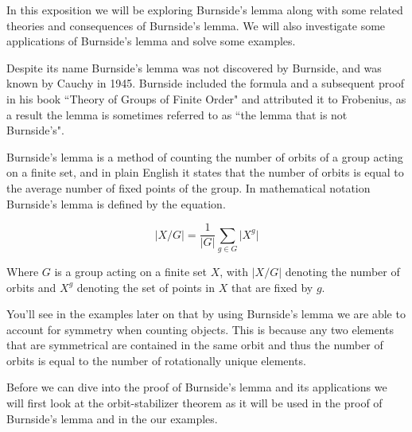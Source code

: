 \documentclass[../main.tex]{subfiles}
\begin{document}
    In this exposition we will be exploring Burnside's lemma along with some related theories and consequences of Burnside's lemma. We will also investigate some applications of Burnside's lemma and solve some examples.
    
    Despite its name Burnside's lemma was not discovered by Burnside, and was known by Cauchy in 1945. Burnside included the formula and a subsequent proof in his book ``Theory of Groups of Finite Order" and attributed it to Frobenius, as a result the lemma is sometimes referred to as ``the lemma that is not Burnside's".
    
    Burnside's lemma is a method of counting the number of orbits of a group acting on a finite set, and in plain English it states that the number of orbits is equal to the average number of fixed points of the group. In mathematical notation Burnside's lemma is defined by the equation.
    
    \begin{equation*}
        \lvert X / G \rvert = \frac{1}{\lvert G \rvert} \sum_{g \in G} \lvert X^g \rvert
    \end{equation*}
    
    Where $G$ is a group acting on a finite set $X$, with $ \lvert X/G \rvert $ denoting the number of orbits and $X^g$ denoting the set of points in $X$ that are fixed by $g$.

    You'll see in the examples later on that by using Burnside's lemma we are able to account for symmetry when counting objects. This is because any two elements that are symmetrical are contained in the same orbit and thus the number of orbits is equal to the number of rotationally unique elements.

    Before we can dive into the proof of Burnside's lemma and its applications we will first look at the orbit-stabilizer theorem as it will be used in the proof of Burnside's lemma and in the our examples.
    
\end{document}
